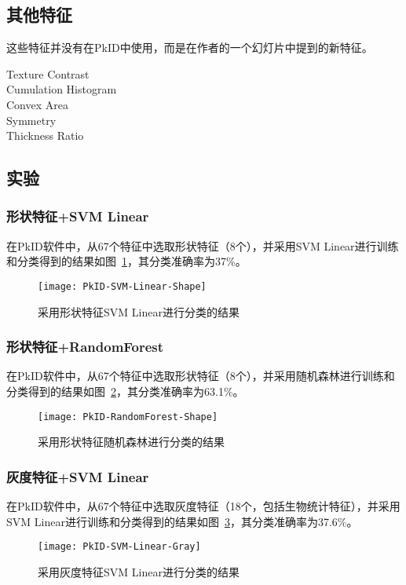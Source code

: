 \subsection{其他特征}
这些特征并没有在PkID中使用，而是在作者的一个幻灯片中提到的新特征。
\begin{description}
\item[Texture Contrast] 
\item[Cumulation Histogram]
\item[Convex Area]
\item[Symmetry]
\item[Thickness Ratio]
\end{description}


\subsection{实验}

\subsubsection{形状特征+SVM Linear}
在PkID软件中，从67个特征中选取形状特征（8个），并采用SVM Linear进行训练和分类得到的结果如图~\ref{fig:PkID-SVM-Linear-Shape}，其分类准确率为37\%。
\begin{figure}[!ht]
\centering
\texttt{[image: PkID-SVM-Linear-Shape]}
\caption{采用形状特征SVM Linear进行分类的结果}
\label{fig:PkID-SVM-Linear-Shape}
\end{figure}

\subsubsection{形状特征+RandomForest}
在PkID软件中，从67个特征中选取形状特征（8个），并采用随机森林进行训练和分类得到的结果如图~\ref{fig:PkID-RandomForest-Shape}，其分类准确率为63.1\%。

\begin{figure}[!ht]
\centering
\texttt{[image: PkID-RandomForest-Shape]}
\caption{采用形状特征随机森林进行分类的结果}
\label{fig:PkID-RandomForest-Shape}
\end{figure}

\subsubsection{灰度特征+SVM Linear}
在PkID软件中，从67个特征中选取灰度特征（18个，包括生物统计特征），并采用SVM Linear进行训练和分类得到的结果如图~\ref{fig:PkID-SVM-Linear-Gray}，其分类准确率为37.6\%。
\begin{figure}[!ht]
\centering
\texttt{[image: PkID-SVM-Linear-Gray]}
\caption{采用灰度特征SVM Linear进行分类的结果}
\label{fig:PkID-SVM-Linear-Gray}
\end{figure}

